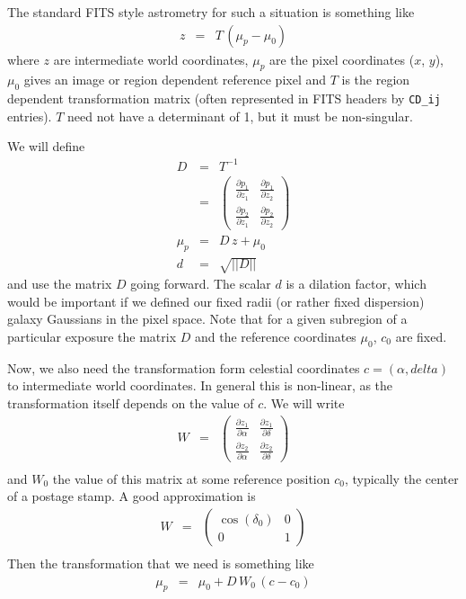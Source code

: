 \documentclass[modern]{aastex62}
\renewcommand{\det}[1]{||{#1}||}
\begin{document}
The standard FITS style astrometry for such a situation \citep{greisen02} is something like
\begin{eqnarray}
z & = & T \, (\mu_p - \mu_0)
\end{eqnarray}
where $z$ are intermediate world coordinates,
$\mu_p$ are the pixel coordinates ($x$, $y$),
$\mu_0$ gives an image or region dependent reference pixel
and $T$ is the region dependent transformation matrix (often represented in FITS headers by \texttt{CD\_ij} entries).
$T$ need not have a determinant of 1, but it must be non-singular. 

We will define
\begin{eqnarray}
D & = & T^{-1} \\
 & = & \begin{pmatrix} \frac{\partial p_1}{\partial z_1} & \frac{\partial p_1}{\partial z_2} \\ \frac{\partial p_2}{\partial z_1} & \frac{\partial p_2}{\partial z_2 }\end{pmatrix} \\
\mu_p & = & D \, z + \mu_0 \nonumber \\
d & = &\sqrt{\det{D}} \nonumber
\end{eqnarray}
and use the matrix $D$ going forward.
The scalar $d$ is a dilation factor, which would be important if we defined our fixed radii (or rather fixed dispersion) galaxy Gaussians  in the pixel space.
Note that for a given subregion of a particular exposure the matrix $D$ and the reference coordinates $\mu_0$, $c_0$ are fixed.

Now, we also need the transformation form celestial coordinates $c = (\alpha, delta)$ to intermediate world coordinates.
In general this is non-linear, as the transformation itself depends on the value of $c$.
We will write
\begin{eqnarray}
  W & = &
          \begin{pmatrix} \frac{\partial z_1}{\partial \alpha} & \frac{\partial z_1}{\partial \delta} \\
            \frac{\partial z_2}{\partial \alpha} & \frac{\partial z_2}{\partial \delta }
          \end{pmatrix} \\
\end{eqnarray}
and $W_0$ the value of this matrix at some reference position $c_0$, typically the center of a postage stamp.
A good approximation is 
\begin{eqnarray}
W & = & \begin{pmatrix}  \cos(\delta_0) & 0 \\ 0& 1 \end{pmatrix} \\
\end{eqnarray}
Then the transformation that we need is something like
\begin{eqnarray}
\mu_p & = & \mu_0 + D \, W_0 \, (c-c_0) 
\end{eqnarray}
\end{document}
